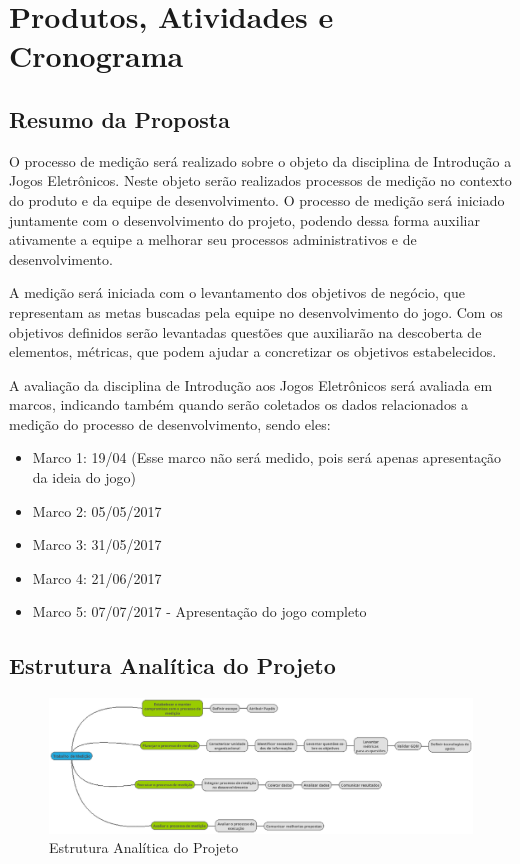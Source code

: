 \chapter{Produtos, Atividades e Cronograma}

\section{Resumo da Proposta}
	O processo de medição será realizado sobre o objeto da disciplina de Introdução a Jogos Eletrônicos. Neste objeto serão realizados processos de medição no contexto do produto e da equipe de desenvolvimento. O processo de medição será iniciado juntamente com o desenvolvimento do projeto, podendo dessa forma auxiliar ativamente a equipe a melhorar seu processos administrativos e de desenvolvimento.
	
	A medição será iniciada com o levantamento dos objetivos de negócio, que representam as metas buscadas pela equipe no desenvolvimento do jogo. Com os objetivos definidos serão levantadas questões que auxiliarão na descoberta de elementos, métricas, que podem ajudar a concretizar os objetivos estabelecidos.

	A avaliação da disciplina de Introdução aos Jogos Eletrônicos será avaliada em marcos, indicando também quando serão coletados os dados relacionados a medição do processo de desenvolvimento, sendo eles:

	\begin{itemize}
		\item Marco 1: 19/04 (Esse marco não será medido, pois será apenas apresentação da ideia do jogo)
		\item Marco 2: 05/05/2017
		\item Marco 3: 31/05/2017
		\item Marco 4: 21/06/2017
		\item Marco 5: 07/07/2017 - Apresentação do jogo completo
	\end{itemize}
	
\section{Estrutura Analítica do Projeto}
	\begin{figure}[!htpb]
		\centering
		\includegraphics [scale=0.35]{figuras/processo/eap}
		\caption{Estrutura Analítica do Projeto}
	\end{figure}
	
